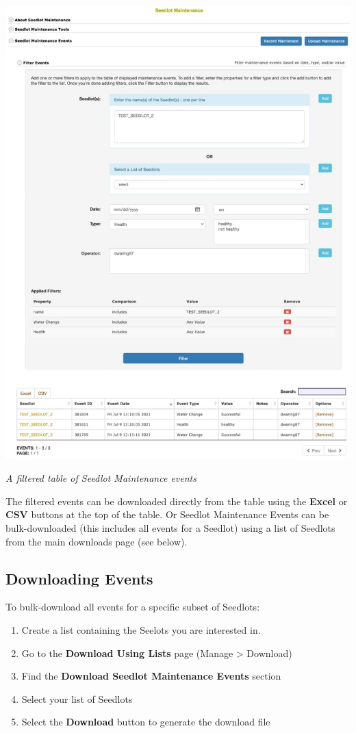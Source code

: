 \documentclass[
  12pt,
]{book}
\providecommand{\tightlist}{%
  \setlength{\itemsep}{0pt}\setlength{\parskip}{0pt}}
\begin{document}
\begin{center}\includegraphics[width=0.95\linewidth]{assets/images/seedlot_maintenance_events_filtered} \end{center}

\emph{A filtered table of Seedlot Maintenance events}

The filtered events can be downloaded directly from the table using the \textbf{Excel} or \textbf{CSV} buttons at the top of the table. Or Seedlot Maintenance Events can be bulk-downloaded (this includes all events for a Seedlot) using a list of Seedlots from the main downloads page (see below).

\hypertarget{downloading-events}{%
\subsection{Downloading Events}\label{downloading-events}}

To bulk-download all events for a specific subset of Seedlots:

\begin{enumerate}
\def\labelenumi{\arabic{enumi}.}
\tightlist
\item
  Create a list containing the Seelots you are interested in.
\item
  Go to the \textbf{Download Using Lists} page (Manage \textgreater{} Download)
\item
  Find the \textbf{Download Seedlot Maintenance Events} section
\item
  Select your list of Seedlots
\item
  Select the \textbf{Download} button to generate the download file
\end{enumerate}
\end{document}
